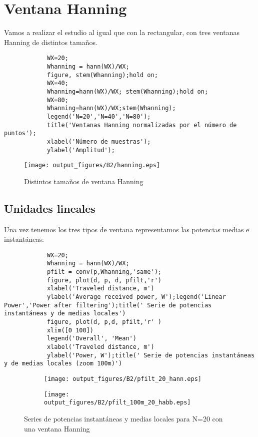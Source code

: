 \documentclass{article}
\begin{document}
    \section{Ventana Hanning}
        \par Vamos a realizar el estudio al igual que con la rectangular, con tres ventanas Hanning de distintos tamaños.
        \begin{lstlisting}
            WX=20;
            Whanning = hann(WX)/WX;
            figure, stem(Whanning);hold on;
            WX=40;
            Whanning=hann(WX)/WX; stem(Whanning);hold on;
            WX=80;
            Whanning=hann(WX)/WX;stem(Whanning);
            legend('N=20','N=40','N=80');
            title('Ventanas Hanning normalizadas por el número de puntos');
            xlabel('Número de muestras');
            ylabel('Amplitud');
        \end{lstlisting}    
        \begin{figure}[h]
            \centering
            \texttt{[image: output\_figures/B2/hanning.eps]}
            \caption{Distintos tamaños de ventana Hanning}
            \label{fig:my_label}
        \end{figure}
        \clearpage
        \subsection{Unidades lineales}
        \par Una vez tenemos los tres tipos de ventana representamos las potencias medias e instantáneas:
        \begin{lstlisting}
            WX=20;
            Whanning = hann(WX)/WX;
            pfilt = conv(p,Whanning,'same');
            figure, plot(d, p, d, pfilt,'r')
            xlabel('Traveled distance, m')
            ylabel('Average received power, W');legend('Linear Power','Power after filtering');title(' Serie de potencias instantáneas y de medias locales')
            figure, plot(d, p,d, pfilt,'r' )
            xlim([0 100])
            legend('Overall', 'Mean')
            xlabel('Traveled distance, m')
            ylabel('Power, W');title(' Serie de potencias instantáneas y de medias locales (zoom 100m)')
        \end{lstlisting}        
        \begin{figure}[h]
                \centering
                \begin{subfigure}
                    \centering          \texttt{[image: output\_figures/B2/pfilt\_20\_hann.eps]}
               \end{subfigure}
               \begin{subfigure}
                    \centering          \texttt{[image: output\_figures/B2/pfilt\_100m\_20\_habb.eps]}
               \end{subfigure}    
               \caption{Series de potencias instantáneas y medias locales para N=20 con una ventana Hanning}
                \label{fig:sup_rugosas}
            \end{figure}
            
\end{document}
